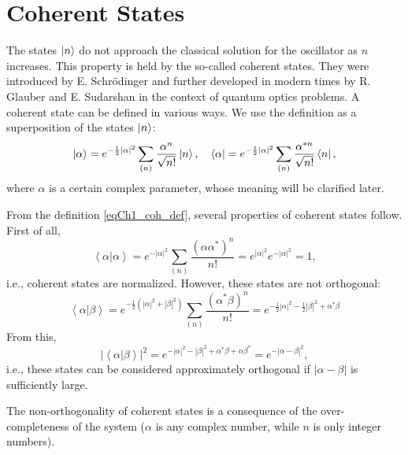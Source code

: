 \section{Coherent States}
The states $\ket{n}$ do not approach the classical solution for the oscillator as $n$ increases. This property is held by the so-called coherent states. They were introduced by E. Schrödinger and further developed in modern times by R. Glauber \cite{bQuantumOpticsAndRadioPhisicsLecture1966} and E. Sudarshan \cite{bKaluderSudershan1970} in the context of quantum optics problems. A coherent state can be defined in various ways. We use the definition as a superposition of the states $\ket{n}$:
\begin{equation}
\left|\alpha\right> = e^{-\frac{1}{2} \left|\alpha\right|^2}
\sum_{(n)} \frac{\alpha^n}{\sqrt{n!}}\ket{n},
\quad
\left<\alpha\right| = e^{-\frac{1}{2} \left|\alpha\right|^2}
\sum_{(n)} \frac{\alpha^{*n}}{\sqrt{n!}}\bra{n},
\label{eqCh1_coh_def}
\end{equation}
where $\alpha$ is a certain complex parameter, whose meaning will be clarified later.

From the definition \eqref{eqCh1_coh_def}, several properties of coherent states follow. First of all,
\begin{equation}
\left<\alpha\right|\left.\alpha\right> = 
e^{-\left|\alpha\right|^2}\sum_{(n)}
\frac{\left(\alpha\alpha^{*}\right)^n}{n!} = 
e^{\left|\alpha\right|^2} e^{-\left|\alpha\right|^2} = 1,
\end{equation}
i.e., coherent states are normalized. However, these states are not orthogonal:
\begin{equation}
\left<\alpha\right|\left.\beta\right> = 
e^{-\frac{1}{2}\left(\left|\alpha\right|^2 +
  \left|\beta\right|^2\right)}\sum_{(n)} 
\frac{\left(\alpha^{*}\beta\right)^n}{n!} = 
e^{
-\frac{1}{2} \left|\alpha\right|^2  -\frac{1}{2} \left|\beta\right|^2
+
\alpha^{*} \beta 
}
\label{eqCh1_ortog}
\end{equation}
From this,
\begin{equation}
\left|\left<\alpha\right|\left.\beta\right>\right|^2 = 
e^{
-\left|\alpha\right|^2  - \left|\beta\right|^2
+
\alpha^{*} \beta  + \alpha \beta^{*}} = 
e^{-\left|\alpha - \beta\right|^2}, 
\end{equation}
i.e., these states can be considered approximately orthogonal if
$\left|\alpha - \beta\right|$ is sufficiently large.

The non-orthogonality of coherent states is a consequence of the over-completeness of the system ($\alpha$ is any complex number, while $n$ is only integer numbers).

